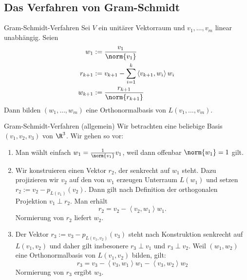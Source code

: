 \documentclass[german]{../spicker}
\newcommand{\scalarprod}[1]{\left\langle #1 \right\rangle}
\begin{document}
\subsection{Das Verfahren von Gram-Schmidt}
\begin{defi}{Gram-Schmidt-Verfahren}
    Sei $V$ ein unitärer Vektorraum und $v_1, \ldots, v_m$ linear unabhängig.
    Seien
    $$
        \begin{aligned}
            w_1     & :={} \frac{v_1}{\norm{v_1}}                              \\
            r_{k+1} & :={} v_{k+1} - \sum^k_{i=1} \scalarprod{v_{k+1}, w_i}w_i \\
            w_{k+1} & :={} \frac{r_{k+1}}{\norm{r_{k+1}}}
        \end{aligned}
    $$
    Dann bilden $(w_1, \ldots, w_m)$ eine Orthonormalbasis von $L(v_1, \ldots, v_m)$.
\end{defi}

\begin{example}{Gram-Schmidt-Verfahren (allgemein)}
    Wir betrachten eine beliebige Basis $(v_1, v_2, v_3)$ von $\R^3$.
    Wir gehen so vor:
    \begin{enumerate}
        \item Man wählt einfach $w_1 = \frac{1}{\norm{v_1}}v_1$, weil dann offenbar $\norm{w_1} = 1$ gilt.
        \item Wir konstruieren einen Vektor $r_2$, der senkrecht auf $w_1$ steht.
              Dazu projizieren wir $v_2$ auf den von $w_1$ erzeugen Unterraum $L(w_1)$ und setzen $r_2 := v_2 - p_{L(v_1)}(v_2)$.
              Dann gilt nach Definition der orthogonalen Projektion $v_1 \perp r_2$.
              Man erhält
              $$
                  r_2 = v_2 - \scalarprod{v_2, w_1}w_1.
              $$
              Normierung von $r_2$ liefert $w_2$.
        \item Der Vektor $r_3 := v_3 - p_{L(v_1, v_2)}(v_3)$ steht nach Konstruktion senkrecht auf $L(v_1, v_2)$ und daher gilt insbesonere $r_3 \perp v_1$ und $r_3 \perp v_2$.
              Weil $(w_1, w_2)$ eine Orthonormalbasis von $L(v_1, v_2)$ bilden, gilt:
              $$
                  r_3 = v_3 - \scalarprod{v_3, w_1}w_1 - \scalarprod{v_3, w_2}w_2
              $$
              Normierung von $r_3$ ergibt $w_3$.
    \end{enumerate}
\end{example}


\printindex
\printindex[Beispiele]
\end{document}
